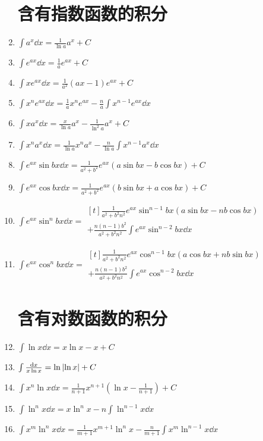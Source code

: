 \begin{enumerate}
\section*{含有指数函数的积分}
\item \(\int a^x \dd{x} = \frac{1}{\ln a} a^x + C\)
\item \(\int e^{ax} \dd{x} = \frac{1}{a} e^{ax} + C\)
\item \(\int x e^{ax} \dd{x} = \frac{1}{a^2} (ax-1) e^{ax} + C\)
\item \(\int x^n e^{ax} \dd{x} = \frac{1}{a} x^n e^{ax} - \frac{n}{a} \int x^{n-1} e^{ax} \dd{x}\)
\item \(\int x a^x \dd{x} = \frac{x}{\ln a} a^x - \frac{1}{\ln^2 a} a^x + C\)
\item \(\int x^n a^x \dd{x}
= \frac{1}{\ln a} x^n a^x - \frac{n}{\ln a} \int x^{n-1} a^x \dd{x}\)
\item \(\int e^{ax} \sin bx \dd{x}
= \frac{1}{a^2+b^2} e^{ax} (a \sin bx - b \cos bx) + C\)
\item \(\int e^{ax} \cos bx \dd{x}
= \frac{1}{a^2+b^2} e^{ax} (b \sin bx + a \cos bx) + C\)
\item \(\int e^{ax} \sin^n bx \dd{x}
= \begin{aligned}[t]
	\frac{1}{a^2+b^2n^2} e^{ax} \sin^{n-1}bx (a \sin bx - nb \cos bx) \\
	+ \frac{n(n-1)b^2}{a^2+b^2n^2} \int e^{ax} \sin^{n-2}bx \dd{x}
\end{aligned}\)
\item \(\int e^{ax} \cos^n bx \dd{x}
= \begin{aligned}[t]
	\frac{1}{a^2+b^2n^2} e^{ax} \cos^{n-1}bx (a \cos bx + nb \sin bx) \\
	+ \frac{n(n-1)b^2}{a^2+b^2n^2} \int e^{ax} \cos^{n-2}bx \dd{x}
\end{aligned}\)

\section*{含有对数函数的积分}
\item \(\int \ln x \dd{x} = x \ln x - x + C\)
\item \(\int \frac{\dd{x}}{x \ln x} = \ln\abs{\ln x} + C\)
\item \(\int x^n \ln x \dd{x}
= \frac{1}{n+1} x^{n+1} \left(\ln x - \frac{1}{n+1}\right) + C\)
\item \(\int \ln^n x \dd{x}
= x \ln^n x - n \int \ln^{n-1} x \dd{x}\)
\item \(\int x^m \ln^n x \dd{x}
= \frac{1}{m+1} x^{m+1} \ln^n x - \frac{n}{m+1} \int x^m \ln^{n-1} x \dd{x}\)


\end{enumerate}
